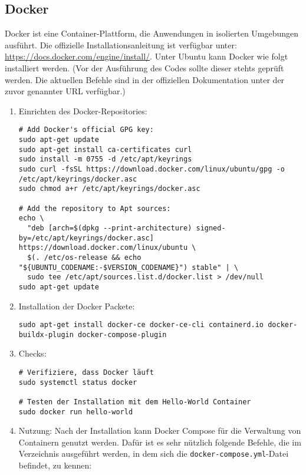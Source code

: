 \documentclass[12pt,a4paper]{report}
\begin{document}
  \subsection{Docker}  
  Docker ist eine Container-Plattform, die Anwendungen in isolierten Umgebungen ausführt.  
  Die offizielle Installationsanleitung ist verfügbar unter: \url{https://docs.docker.com/engine/install/}.  
  Unter Ubuntu kann Docker wie folgt installiert werden.  
  (Vor der Ausführung des Codes sollte dieser stehts geprüft werden. 
  Die aktuellen Befehle sind in der offiziellen Dokumentation unter der zuvor genannter URL verfügbar.)
  \begin{enumerate}
    \item Einrichten des Docker-Repositories:
    \begin{verbatim}
# Add Docker's official GPG key:
sudo apt-get update
sudo apt-get install ca-certificates curl
sudo install -m 0755 -d /etc/apt/keyrings
sudo curl -fsSL https://download.docker.com/linux/ubuntu/gpg -o /etc/apt/keyrings/docker.asc
sudo chmod a+r /etc/apt/keyrings/docker.asc

# Add the repository to Apt sources:
echo \
  "deb [arch=$(dpkg --print-architecture) signed-by=/etc/apt/keyrings/docker.asc] https://download.docker.com/linux/ubuntu \
  $(. /etc/os-release && echo "${UBUNTU_CODENAME:-$VERSION_CODENAME}") stable" | \
  sudo tee /etc/apt/sources.list.d/docker.list > /dev/null
sudo apt-get update
    \end{verbatim} 

    \item Installation der Docker Packete:
    \begin{verbatim}
sudo apt-get install docker-ce docker-ce-cli containerd.io docker-buildx-plugin docker-compose-plugin
    \end{verbatim}

    \item Checks:
    \begin{verbatim}
# Verifiziere, dass Docker läuft
sudo systemctl status docker

# Testen der Installation mit dem Hello-World Container
sudo docker run hello-world
    \end{verbatim} 
  
    \item Nutzung:
    Nach der Installation kann Docker Compose für die Verwaltung von Containern genutzt werden.  
    Dafür ist es sehr nützlich folgende Befehle, die im Verzeichnis ausgeführt werden, 
    in dem sich die \texttt{docker-compose.yml}-Datei befindet, zu kennen:


\end{enumerate}
\end{document}
